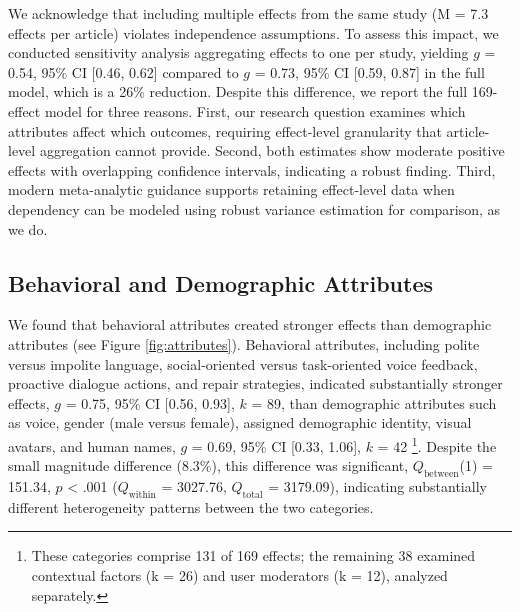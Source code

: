 \documentclass[sigconf,review,anonymous]{acmart}
\begin{document}
We acknowledge that including multiple effects from the same study (M = 7.3 effects per article) violates independence assumptions. To assess this impact, we conducted sensitivity analysis aggregating effects to one per study, yielding $g$ = 0.54, 95\% CI [0.46, 0.62] compared to $g$ = 0.73, 95\% CI [0.59, 0.87] in the full model, which is a 26\% reduction. Despite this difference, we report the full 169-effect model for three reasons. First, our research question examines which attributes affect which outcomes, requiring effect-level granularity that article-level aggregation cannot provide. Second, both estimates show moderate positive effects with overlapping confidence intervals, indicating a robust finding. Third, modern meta-analytic guidance \cite{justo_pooled_2025} supports retaining effect-level data when dependency can be modeled using robust variance estimation \cite{hedges2010} for comparison, as we do. 

\subsection{Behavioral and Demographic Attributes} \label{sec:beh}

We found that behavioral attributes created stronger effects than demographic attributes (see Figure \ref{fig:attributes}). Behavioral attributes, including polite versus impolite language, social-oriented versus task-oriented voice feedback, proactive dialogue actions, and repair strategies, indicated substantially stronger effects, $g$ = 0.75, 95\% CI [0.56, 0.93], $k$ = 89, than demographic attributes such as voice, gender (male versus female), assigned demographic identity, visual avatars, and human names, $g$ = 0.69, 95\% CI [0.33, 1.06], $k$ = 42 \footnote{These categories comprise 131 of 169 effects; the remaining 38 examined contextual factors (k = 26) and user moderators (k = 12), analyzed separately.}. Despite the small magnitude difference (8.3\%), this difference was significant, $Q_{\text{between}}$(1) = 151.34, $p$ < .001 ($Q_{\text{within}}$ = 3027.76, $Q_{\text{total}}$ = 3179.09), indicating substantially different heterogeneity patterns between the two categories.
\end{document}
